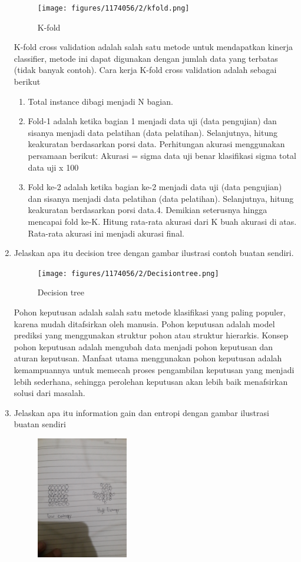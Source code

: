 \begin{enumerate}
	\hfill\break
	\begin{figure}[H]
		\texttt{[image: figures/1174056/2/kfold.png]}
		\centering
		\caption{K-fold}
	\end{figure}
	\hfill\break
	K-fold cross validation adalah salah satu metode untuk mendapatkan kinerja classifier, 
	metode ini dapat digunakan dengan jumlah data yang terbatas (tidak banyak contoh).
	Cara kerja K-fold cross validation adalah sebagai berikut
	\begin{enumerate}
		\item Total instance dibagi menjadi N bagian.
		\item Fold-1 adalah ketika bagian 1 menjadi data uji (data pengujian) dan sisanya menjadi data pelatihan (data pelatihan).
		\hfill\break
		Selanjutnya, hitung keakuratan berdasarkan porsi data. Perhitungan akurasi menggunakan persamaan berikut:
		Akurasi = sigma data uji benar klasifikasi sigma total data uji x 100%
		\item Fold ke-2 adalah ketika bagian ke-2 menjadi data uji (data pengujian) dan sisanya menjadi data pelatihan (data pelatihan).
		\hfill\break
		Selanjutnya, hitung keakuratan berdasarkan porsi data.4. 
		Demikian seterusnya hingga mencapai fold ke-K. 
		Hitung rata-rata akurasi dari K buah akurasi di atas. 
		Rata-rata akurasi ini menjadi akurasi final.
	\end{enumerate}
	\item Jelaskan apa itu decision tree dengan gambar ilustrasi contoh buatan sendiri.
	\hfill\break
	\begin{figure}[H]
		\texttt{[image: figures/1174056/2/Decisiontree.png]}
		\centering
		\caption{Decision tree}
	\end{figure}
	\hfill\break
	Pohon keputusan adalah salah satu metode klasifikasi yang paling populer, karena mudah ditafsirkan oleh manusia. 
	Pohon keputusan adalah model prediksi yang menggunakan struktur pohon atau struktur hierarkis.
	Konsep pohon keputusan adalah mengubah data menjadi pohon keputusan dan aturan keputusan. 
	Manfaat utama menggunakan pohon keputusan adalah kemampuannya untuk memecah proses pengambilan keputusan yang menjadi lebih sederhana, 
	sehingga perolehan keputusan akan lebih baik menafsirkan solusi dari masalah.
	\item Jelaskan apa itu information gain dan entropi dengan gambar ilustrasi buatan sendiri
	\hfill\break
	\begin{figure}[H]
		\includegraphics[width=4cm]{figures/1174056/2/entropi.jpg}

\end{figure}
\end{enumerate}
